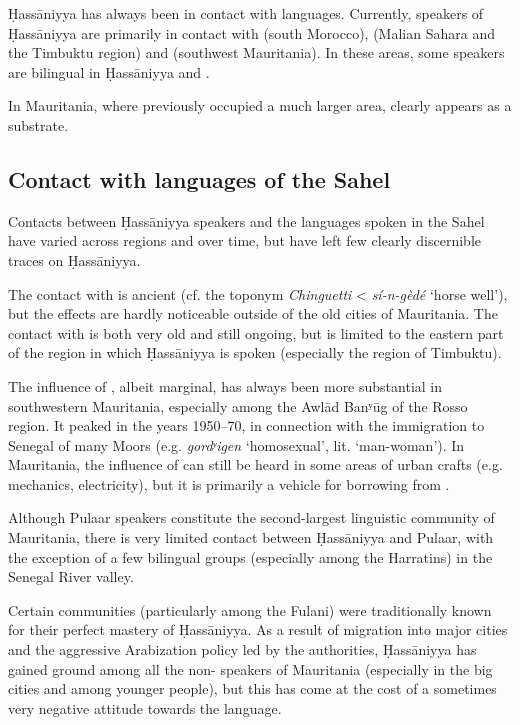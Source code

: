 \documentclass[output=paper]{langsci/langscibook}
\begin{document}
Ḥassāniyya has always been in contact with  languages. Currently, speakers of Ḥassāniyya are primarily in contact with  (south Morocco),  (Malian Sahara and the Timbuktu region) and  (southwest Mauritania). In these areas, some speakers are bilingual in Ḥassāniyya and . 

In Mauritania, where  previously occupied a much larger area,  clearly appears as a {substrate}.

\subsection{Contact with languages of the Sahel} %

Contacts between Ḥassāniyya speakers and the languages spoken in the Sahel have varied across regions and over time, but have left few clearly discernible traces on Ḥassāniyya.

The contact with  is ancient (cf. the toponym \textit{Chinguetti} <  \textit{sí-n-gèdé} ‘horse well’), but the effects are hardly noticeable outside of the old cities of Mauritania. The contact with  is both very old and still ongoing, but is limited to the eastern part of the region in which Ḥassāniyya is spoken (especially the region of Timbuktu).

The influence of , albeit marginal, has always been more substantial in southwestern Mauritania, especially among the Awlād Banʸūg of the Rosso region. It peaked in the years 1950–70, in connection with the immigration to Senegal of many Moors (e.g. \textit{gordʸigen} ‘homosexual’, lit. ‘man-woman’). In Mauritania, the influence of  can still be heard in some areas of urban crafts (e.g. mechanics, electricity), but it is primarily a vehicle for borrowing from .

Although Pulaar speakers constitute the second-largest linguistic community of Mauritania, there is very limited contact between Ḥassāniyya and Pulaar, with the exception of a few bilingual groups (especially among the Harratins) in the Senegal River valley.

Certain communities (particularly among the Fulani) were traditionally known for their perfect mastery of Ḥassāniyya. As a result of migration into major cities and the aggressive {Arabization} policy led by the authorities, Ḥassāniyya has gained ground among all the non- speakers of Mauritania (especially in the big cities and among younger people), but this has come at the cost of a sometimes very negative attitude towards the language. 
\end{document}
